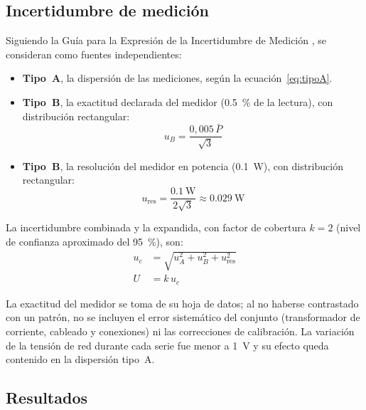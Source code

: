 \subsection{Incertidumbre de medición}

Siguiendo la Guía para la Expresión de la Incertidumbre de Medición
\cite{gum}, se consideran como fuentes independientes:
\begin{itemize}
    \item \textbf{Tipo~A}, la dispersión de las mediciones, según la
          ecuación~\eqref{eq:tipoA}.
    \item \textbf{Tipo~B}, la exactitud declarada del medidor
          (\SI{0,5}{\percent} de la lectura), con distribución rectangular:
          \begin{equation}
              u_{B} = \frac{0{,}005\,\bar{P}}{\sqrt{3}}
              \label{eq:tipoB}
          \end{equation}
    \item \textbf{Tipo~B}, la resolución del medidor en potencia
          (\SI{0,1}{\watt}), con distribución rectangular:
          \begin{equation}
              u_{\mathrm{res}} = \frac{\SI{0,1}{\watt}}{2\sqrt{3}}
                               \approx \SI{0,029}{\watt}
              \label{eq:resolucion}
          \end{equation}
\end{itemize}
La incertidumbre combinada y la expandida, con factor de cobertura $k = 2$
(nivel de confianza aproximado del \SI{95}{\percent}), son:
\begin{align}
    u_c &= \sqrt{u_A^2 + u_B^2 + u_{\mathrm{res}}^2}
    \label{eq:combinada} \\
    U &= k \, u_c
    \label{eq:expandida}
\end{align}

La exactitud del medidor se toma de su hoja de datos; al no haberse contrastado
con un patrón, no se incluyen el error sistemático del conjunto (transformador de
corriente, cableado y conexiones) ni las correcciones de calibración. La variación
de la tensión de red durante cada serie fue menor a \SI{1}{\volt} y su efecto
queda contenido en la dispersión tipo~A.

\subsection{Resultados}

